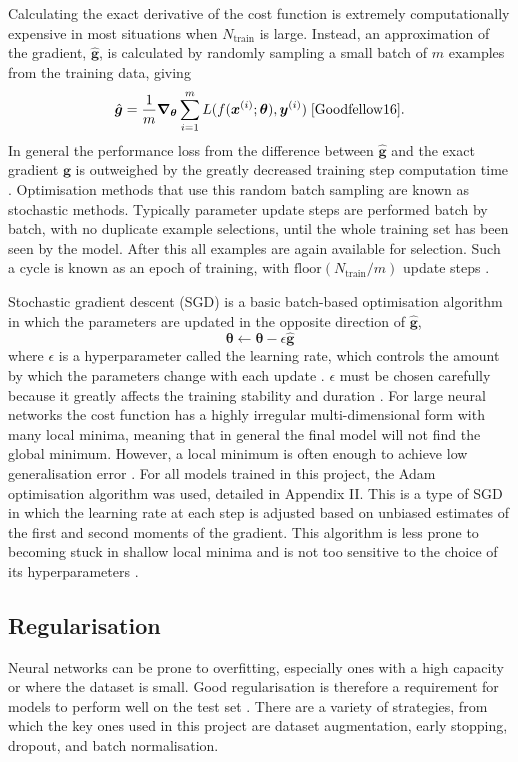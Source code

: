 \documentclass[12pt]{article}
\begin{document}
Calculating the exact derivative of the cost function is extremely computationally expensive in most situations when $N_{\mathrm{train}}$ is large. Instead, an approximation of the gradient, $\hat{\bm{g}}$, is calculated by randomly sampling a small batch of $m$ examples from the training data, giving
\begin{equation}
\hat{\bm{g}}=\frac{1}{m}\bm\nabla_{\bm\theta}\sum_{i=1}^mL(f(\bm{x}^{(i)};\boldsymbol\theta),\bm{y}^{(i)})\;\cite{Goodfellow16}.
\end{equation}
In general the performance loss from the difference between $\hat{\bm{g}}$ and the exact gradient $\bm{g}$ is outweighed by the greatly decreased training step computation time \cite{Goodfellow16}. Optimisation methods that use this random batch sampling are known as stochastic methods. Typically parameter update steps are performed batch by batch, with no duplicate example selections, until the whole training set has been seen by the model. After this all examples are again available for selection. Such a cycle is known as an epoch of training, with $\mathrm{floor}(N_{\mathrm{train}}/m)$ update steps \cite{Goodfellow16}.

Stochastic gradient descent (SGD) is a basic batch-based optimisation algorithm in which the parameters are updated in the opposite direction of $\hat{\bm{g}}$,
\begin{equation}
\bm\theta\leftarrow\bm\theta-\epsilon\hat{\bm{g}}
\end{equation}
where $\epsilon$ is a hyperparameter called the learning rate, which controls the amount by which the parameters change with each update \cite{Amari93}. $\epsilon$ must be chosen carefully because it greatly affects the training stability and duration \cite{Goodfellow16}. For large neural networks the cost function has a highly irregular multi-dimensional form with many local minima, meaning that in general the final model will not find the global minimum. However, a local minimum is often enough to achieve low generalisation error \cite{Goodfellow16}. For all models trained in this project, the Adam optimisation algorithm was used, detailed in Appendix II. This is a type of SGD in which the learning rate at each step is adjusted based on unbiased estimates of the first and second moments of the gradient. This algorithm is less prone to becoming stuck in shallow local minima and is not too sensitive to the choice of its hyperparameters \cite{Kingma14}. 

\subsection{Regularisation}
Neural networks can be prone to overfitting, especially ones with a high capacity or where the dataset is small. Good regularisation is therefore a requirement for models to perform well on the test set \cite{Goodfellow16}. There are a variety of strategies, from which the key ones used in this project are dataset augmentation, early stopping, dropout, and batch normalisation.
\end{document}
